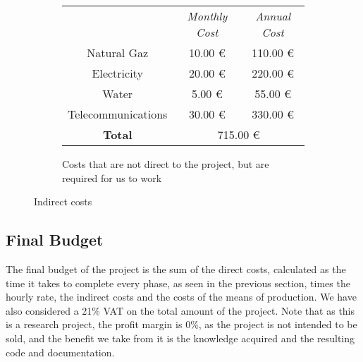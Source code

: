 \begin{figure}[ht]
\begin{subfigure}{\textwidth}
        \centering
        \begin{tabular}{|ccc|}
            \hline
            \rowcolor[HTML]{C0C0C0}
            \multicolumn{3}{|c|}{\cellcolor[HTML]{C0C0C0}\textbf{Indirect costs}}                                                                                      \\ \hline
            \rowcolor[HTML]{EFEFEF}
            \multicolumn{1}{|c|}{\cellcolor[HTML]{EFEFEF}\textit{Service}} & \multicolumn{1}{c|}{\cellcolor[HTML]{EFEFEF}\textit{Monthly Cost}} & \textit{Annual Cost} \\ \hline
            \multicolumn{1}{|c|}{Natural Gaz}                              & \multicolumn{1}{c|}{10.00 €}                                       & 110.00 €             \\ \hline
            \multicolumn{1}{|c|}{Electricity}                              & \multicolumn{1}{c|}{20.00 €}                                       & 220.00 €             \\ \hline
            \multicolumn{1}{|c|}{Water}                                    & \multicolumn{1}{c|}{5.00 €}                                        & 55.00 €              \\ \hline
            \multicolumn{1}{|c|}{Telecommunications}                       & \multicolumn{1}{c|}{30.00 €}                                       & 330.00 €             \\ \hline
            \multicolumn{1}{|c|}{\cellcolor[HTML]{C0C0C0}\textbf{Total}}   & \multicolumn{2}{c|}{715.00 €}                                                             \\ \hline
        \end{tabular}
        \caption{Costs that are not direct to the project, but are required for us to work}
    \end{subfigure}%
    \caption{Indirect costs}
    \label{table:indirect-costs}
\end{figure}

\subsection{Final Budget}

The final budget of the project is the sum of the direct costs, calculated as the time it takes to complete every phase, as seen in the previous section, times the hourly rate, the indirect costs and the costs of the means of production. We have also considered a 21\% VAT on the total amount of the project. Note that as this is a research project, the profit margin is 0\%, as the project is not intended to be sold, and the benefit we take from it is the knowledge acquired and the resulting code and documentation.

